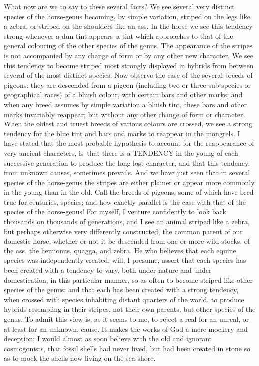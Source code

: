 What now are we to say to these several facts? We see several very distinct species of the horse-genus becoming, by simple variation, striped on the legs like a zebra, or striped on the shoulders like an ass. In the horse we see this tendency strong whenever a dun tint appears--a tint which approaches to that of the general colouring of the other species of the genus. The appearance of the stripes is not accompanied by any change of form or by any other new character. We see this tendency to become striped most strongly displayed in hybrids from between several of the most distinct species. Now observe the case of the several breeds of pigeons: they are descended from a pigeon (including two or three sub-species or geographical races) of a bluish colour, with certain bars and other marks; and when any breed assumes by simple variation a bluish tint, these bars and other marks invariably reappear; but without any other change of form or character. When the oldest and truest breeds of various colours are crossed, we see a strong tendency for the blue tint and bars and marks to reappear in the mongrels. I have stated that the most probable hypothesis to account for the reappearance of very ancient characters, is--that there is a TENDENCY in the young of each successive generation to produce the long-lost character, and that this tendency, from unknown causes, sometimes prevails. And we have just seen that in several species of the horse-genus the stripes are either plainer or appear more commonly in the young than in the old. Call the breeds of pigeons, some of which have bred true for centuries, species; and how exactly parallel is the case with that of the species of the horse-genus! For myself, I venture confidently to look back thousands on thousands of generations, and I see an animal striped like a zebra, but perhaps otherwise very differently constructed, the common parent of our domestic horse, whether or not it be descended from one or more wild stocks, of the ass, the hemionus, quagga, and zebra.
He who believes that each equine species was independently created, will, I presume, assert that each species has been created with a tendency to vary, both under nature and under domestication, in this particular manner, so as often to become striped like other species of the genus; and that each has been created with a strong tendency, when crossed with species inhabiting distant quarters of the world, to produce hybrids resembling in their stripes, not their own parents, but other species of the genus. To admit this view is, as it seems to me, to reject a real for an unreal, or at least for an unknown, cause. It makes the works of God a mere mockery and deception; I would almost as soon believe with the old and ignorant cosmogonists, that fossil shells had never lived, but had been created in stone so as to mock the shells now living on the sea-shore.

